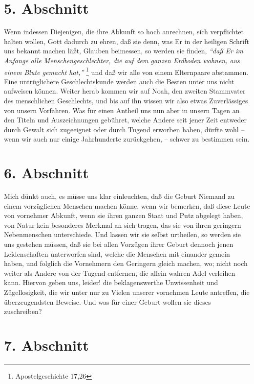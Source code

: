 \section{5. Abschnitt} \label{kap11_ab5}

Wenn indessen Diejenigen, die ihre Abkunft so hoch anrechnen, sich verpflichtet
halten wollen, Gott dadurch zu ehren, daß sie denn, was Er in der heiligen
Schrift uns bekannt machen läßt, Glauben beimessen, so werden sie finden,
\textit{"`daß
Er im Anfange alle Menschengeschlechter, die auf dem ganzen Erdboden wohnen,
aus einem Blute gemacht hat,"'}
\footnote{Apostelgeschichte 17,26}
und daß wir alle
von einem Elternpaare abstammen. Eine untrüglichere Geschlechtskunde werden auch
die Besten unter uns nicht aufweisen können. Weiter herab kommen wir auf
Noah, den zweiten Stammvater des menschlichen Geschlechts,
und bis auf ihn
wissen wir also etwas Zuverlässiges von unsern Vorfahren. Was für einen Antheil
uns nun aber in unsern Tagen an den Titeln und Auszeichnungen gebühret, welche
Andere seit jener Zeit entweder durch Gewalt sich zugeeignet oder
durch Tugend
erworben haben, dürfte wohl -- wenn wir auch nur einige Jahrhunderte
zurückgehen, -- schwer zu bestimmen sein.

\section{6. Abschnitt} \label{kap11_ab6}

Mich dünkt auch, es müsse uns klar einleuchten, daß die Geburt Niemand zu einem
vorzüglichen Menschen machen könne, wenn wir bemerken, daß diese Leute von
vornehmer Abkunft, wenn sie ihren ganzen Staat und Putz abgelegt haben, von
Natur kein besonderes Merkmal an sich tragen, das sie von ihren geringern
Nebenmenschen unterschiede. Und lassen wir sie selbst urtheilen, so werden sie
uns gestehen müssen, daß sie bei allen Vorzügen ihrer Geburt dennoch jenen
Leidenschaften unterworfen sind, welche die Menschen mit
einander gemein haben,
und folglich die Vornehmern den Geringern gleich machen, wo; nicht noch weiter
als Andere von der Tugend entfernen, die allein wahren Adel verleihen kann.
Hiervon geben uns, leider! die beklagenswerthe Unwissenheit und Zügellosigkeit,
die wir unter nur zu Vielen unserer vornehmen Leute antreffen, die
überzeugendsten Beweise. Und was für einer Geburt wollen sie dieses zuschreiben?

\section{7. Abschnitt} \label{kap11_ab7}

